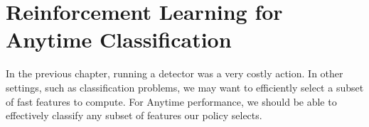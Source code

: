\chapter{Reinforcement Learning for Anytime Classification}

In the previous chapter, running a detector was a very costly action.
In other settings, such as classification problems, we may want to efficiently select a subset of fast features to compute.
For Anytime performance, we should be able to effectively classify any subset of features our policy selects.






